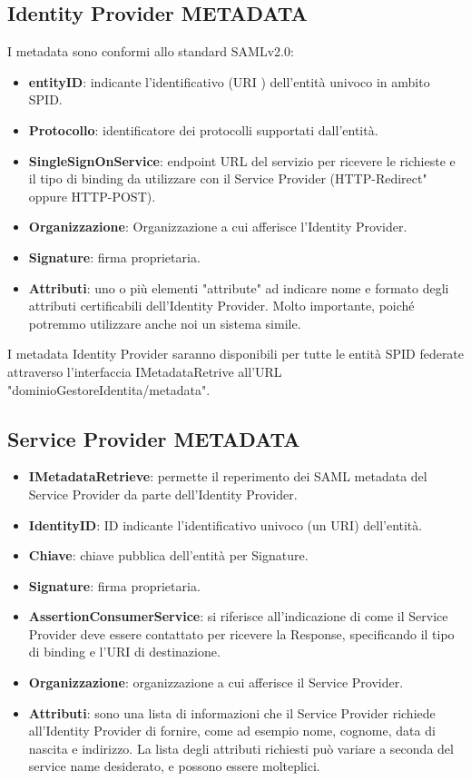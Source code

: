 \subsection{Identity Provider METADATA}
I metadata sono conformi allo standard SAMLv2.0:
\begin{itemize}
    \item \textbf{entityID}: indicante l’identificativo (URI
    ) dell’entità univoco in ambito SPID.
    \item \textbf{Protocollo}: identificatore dei protocolli supportati dall'entità.
    \item \textbf{SingleSignOnService}: endpoint URL del servizio per ricevere le richieste e il tipo di binding da utilizzare con il Service Provider (HTTP-Redirect" oppure HTTP-POST).
    \item \textbf{Organizzazione}: Organizzazione a cui afferisce l'Identity Provider.
    \item \textbf{Signature}: firma proprietaria.
    \item \textbf{Attributi}: uno o più elementi "attribute" ad indicare nome e formato degli attributi certificabili dell’Identity Provider.
    Molto importante, poiché potremmo utilizzare anche noi un sistema simile.
\end{itemize}
I metadata Identity Provider saranno disponibili per tutte le entità SPID federate attraverso
l’interfaccia IMetadataRetrive all'URL "dominioGestoreIdentita/metadata".

\subsection{Service Provider METADATA}

\begin{itemize}
    \item \textbf{IMetadataRetrieve}: permette il reperimento dei SAML metadata del Service Provider da parte dell’Identity Provider.
    \item \textbf{IdentityID}: ID indicante l’identificativo univoco (un URI) dell’entità.
    \item \textbf{Chiave}: chiave pubblica dell'entità per Signature.
    \item \textbf{Signature}: firma proprietaria.
    \item \textbf{AssertionConsumerService}: si riferisce all'indicazione di come il Service Provider deve essere contattato per ricevere la Response, specificando il tipo di binding e l'URI di destinazione.
    \item \textbf{Organizzazione}: organizzazione a cui afferisce il Service Provider.
    \item \textbf{Attributi}: sono una lista di informazioni che il Service Provider richiede all'Identity Provider di fornire, come ad esempio nome, cognome, data di nascita e indirizzo. La lista degli attributi richiesti può variare a seconda del service name desiderato, e possono essere molteplici.
\end{itemize}

